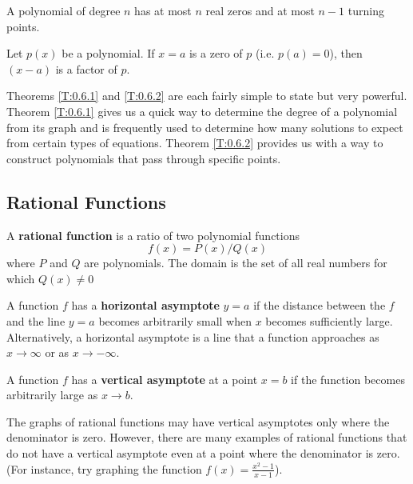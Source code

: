 \begin{theorem}
	A polynomial of degree $n$ has at most $n$ real zeros and at most $n-1$ turning points.\label{T:0.6.1}
\end{theorem}

\begin{theorem}\label{T:0.6.2}
	Let $p(x)$ be a polynomial.  If $x = a$ is a zero of $p$ (i.e. $p(a)=0$), then $(x-a)$ is a factor of $p$.
\end{theorem}

Theorems \ref{T:0.6.1} and \ref{T:0.6.2} are each fairly simple to state but very powerful.  Theorem \ref{T:0.6.1} gives us a quick way to determine the degree of a polynomial from its graph and is frequently used to determine how many solutions to expect from certain types of equations.  
Theorem \ref{T:0.6.2} provides us with a way to construct polynomials that pass through specific points.  



\subsection*{Rational Functions}

\begin{definition}
	A {\bf rational function} is a ratio of two polynomial functions
		\[ 
			f(x) = P(x)/Q(x)
		\]
	where $P$ and $Q$ are polynomials.  The domain is the set of all real numbers for which $Q(x)\ne 0$
\end{definition}

\begin{definition}
	A function $f$ has a {\bf horizontal asymptote} $y = a$ if the distance between the $f$ and the line $y=a$ becomes arbitrarily small when $x$ becomes sufficiently large.
	Alternatively, a horizontal asymptote is a line that a function approaches as $x \to \infty$ or as $x \to -\infty$. 
\end{definition}

\begin{definition}
    A function $f$ has a {\bf vertical asymptote} at a point $x = b$ if the function becomes arbitrarily large as $x \to b$.
\end{definition}

The graphs of rational functions may have vertical asymptotes only where the denominator is zero.  However, there are many examples of rational functions that do not have a vertical asymptote even at a point where the denominator is zero. (For instance, try graphing the function $f(x)=\displaystyle{\frac{x^{2}-1}{x-1}}$).

